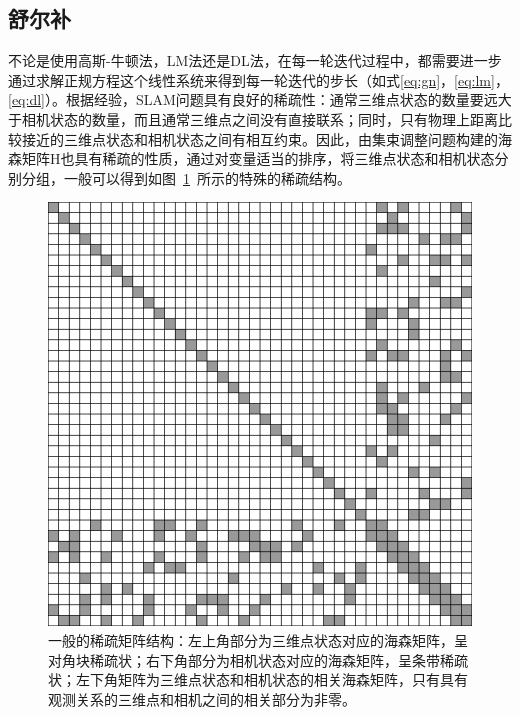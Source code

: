 

\subsection{舒尔补}\label{sec:schur}

不论是使用高斯-牛顿法，LM法还是DL法，在每一轮迭代过程中，都需要进一步通过求解正规方程这个线性系统来得到每一轮迭代的步长（如式\eqref{eq:gn}，\eqref{eq:lm}，\eqref{eq:dl}）。根据经验，SLAM问题具有良好的稀疏性：通常三维点状态的数量要远大于相机状态的数量，而且通常三维点之间没有直接联系；同时，只有物理上距离比较接近的三维点状态和相机状态之间有相互约束。因此，由集束调整问题构建的海森矩阵$\mathrm{H}$也具有稀疏的性质，通过对变量适当的排序，将三维点状态和相机状态分别分组，一般可以得到如图~\ref{fig:sparse_matrix}~所示的特殊的稀疏结构。

\begin{figure}[htb!]
    \centering
    \includegraphics[width=.5\textwidth]{Pictures/sparse_matrix.png}
    \caption{一般的稀疏矩阵结构：左上角部分为三维点状态对应的海森矩阵，呈对角块稀疏状；右下角部分为相机状态对应的海森矩阵，呈条带稀疏状；左下角矩阵为三维点状态和相机状态的相关海森矩阵，只有具有观测关系的三维点和相机之间的相关部分为非零。}
    \label{fig:sparse_matrix}
\end{figure}

